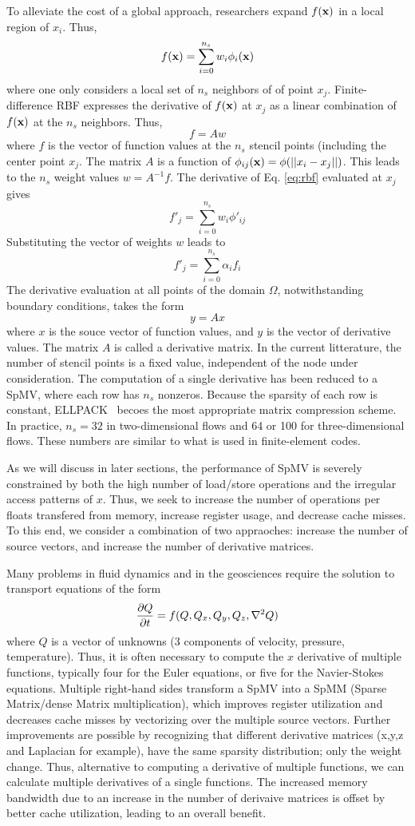 To alleviate the cost of a global approach, researchers \cite{} expand $f({\bf x})$ in a local region of $x_i$. Thus, 
$$
f({\bf x}) =  \sum_{i=0}^{n_s} w_i \phi_i({\bf x}) \label{eq:rbf}
$$
where one only considers a local set of $n_s$ neighbors of of point $x_j$. 
Finite-difference RBF expresses the derivative of $f({\bf x})$ at $x_j$ as a linear
combination of $f({\bf x})$ at the $n_s$ neighbors. Thus, 
$$
f = A w
$$
where $f$ is the vector of function values at the $n_s$ stencil points (including the center point $x_j$. The matrix $A$ is a function of 
$\phi_{ij}({\bf x}) =\phi(||x_i-x_j||)$. This leads to the $n_s$ weight values 
$w = A^{-1} f$. The derivative of Eq. \ref{eq:rbf} evaluated at $x_j$ gives
$$
   f'_j = \sum_{i=0}^{n_s} w_i \phi'_{ij}
$$
Substituting the vector of weights $w$ leads to 
$$
  f'_j = \sum_{i=0}^{n_s} \alpha_i f_i
$$
The derivative evaluation at all points of the domain $\Omega$, notwithstanding boundary conditions, takes the form
$$
  y = A x
$$
where $x$ is the souce vector of function values, and $y$ is the vector of derivative values. The matrix $A$ is called a derivative matrix. In the current litterature, the number of stencil points is 
a fixed value, independent of the node under consideration\cite{}. The computation of a single derivative has been reduced to a SpMV, where each row has $n_s$ nonzeros. Because the sparsity of each row is constant, ELLPACK~\cite{} becoes the most appropriate matrix compression scheme\cite{}. In practice, $n_s=32$ in two-dimensional flows and 64 or 100 for three-dimensional flows. These numbers are similar to what is used in finite-element codes. 

As we will discuss in later sections, the performance of SpMV is severely constrained by both the high number of load/store operations and the irregular access patterns of $x$. Thus, we seek to increase the number of operations per floats transfered from memory, increase register usage, and decrease cache misses. 
To this end, we consider a combination of two appraoches: increase the number of source vectors, and increase the number of derivative matrices. 

Many problems in fluid dynamics and in the geosciences require the solution to
transport equations of the form
$$
{\frac{\partial{Q}}{\partial{t}}} = f(Q,Q_x, Q_y, Q_z, \nabla^2 Q)
$$
where $Q$ is a vector of unknowns (3 components of velocity, pressure, temperature). Thus, it is often necessary to compute the $x$ derivative of 
multiple functions, typically four for the Euler equations, or five for the Navier-Stokes equations. Multiple right-hand sides transform a SpMV into a SpMM (Sparse Matrix/dense Matrix multiplication), which improves register utilization and decreases cache misses by vectorizing over the multiple source vectors. Further improvements are possible by recognizing that different derivative matrices (x,y,z and Laplacian for example), have the same sparsity distribution; only the weight
change.  Thus, alternative to computing a derivative of multiple functions, we
can calculate multiple derivatives of a single functions. The increased memory bandwidth due to an increase in the number of derivaive matrices is offset by 
better cache utilization, leading to an overall benefit. 

